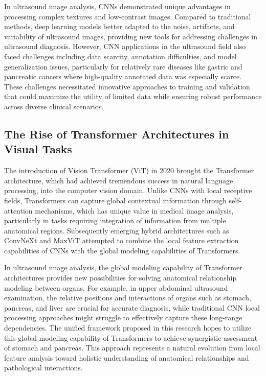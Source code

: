 In ultrasound image analysis, CNNs demonstrated unique advantages in processing complex textures and low-contrast images. Compared to traditional methods, deep learning models better adapted to the noise, artifacts, and variability of ultrasound images, providing new tools for addressing challenges in ultrasound diagnosis. However, CNN applications in the ultrasound field also faced challenges including data scarcity, annotation difficulties, and model generalization issues, particularly for relatively rare diseases like gastric and pancreatic cancers where high-quality annotated data was especially scarce. These challenges necessitated innovative approaches to training and validation that could maximize the utility of limited data while ensuring robust performance across diverse clinical scenarios.

\subsection{The Rise of Transformer Architectures in Visual Tasks}

The introduction of Vision Transformer (ViT) in 2020 brought the Transformer architecture, which had achieved tremendous success in natural language processing, into the computer vision domain. Unlike CNNs with local receptive fields, Transformers can capture global contextual information through self-attention mechanisms, which has unique value in medical image analysis, particularly in tasks requiring integration of information from multiple anatomical regions. Subsequently emerging hybrid architectures such as ConvNeXt and MaxViT attempted to combine the local feature extraction capabilities of CNNs with the global modeling capabilities of Transformers.

In ultrasound image analysis, the global modeling capability of Transformer architectures provides new possibilities for solving anatomical relationship modeling between organs. For example, in upper abdominal ultrasound examination, the relative positions and interactions of organs such as stomach, pancreas, and liver are crucial for accurate diagnosis, while traditional CNN local processing approaches might struggle to effectively capture these long-range dependencies. The unified framework proposed in this research hopes to utilize this global modeling capability of Transformers to achieve synergistic assessment of stomach and pancreas. This approach represents a natural evolution from local feature analysis toward holistic understanding of anatomical relationships and pathological interactions.

